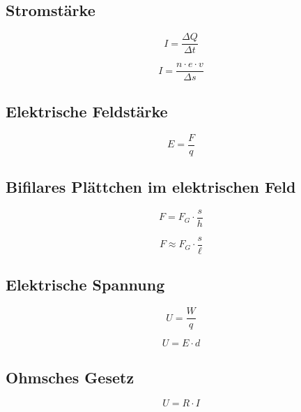 
\subsection{Stromstärke}
\begin{equation}\label{eq:elektrischer:strom}
I = \frac{\Delta Q}{\Delta t}
\end{equation}

\begin{equation}\label{eq:elektrischer:strom:elektronen}
I = \frac{n \cdot e \cdot v}{\Delta s}
\end{equation}

\subsection{Elektrische Feldstärke}
\begin{equation}\label{eq:elektrische:feldstaerke}
E = \frac{F}{q}
\end{equation}

\subsection{Bifilares Plättchen im elektrischen Feld}
\begin{equation}\label{eq:bifilares:plaettchen:1}
F = F_G \cdot \frac{s}{h}
\end{equation}

\begin{equation}\label{eq:bifilares:plaettchen:2}
F \approx F_G \cdot \frac{s}{\ell}
\end{equation}

\subsection{Elektrische Spannung}
\begin{equation}\label{eq:elektrische:spannung}
U = \frac{W}{q}
\end{equation}

\begin{equation}\label{eq:elektrische:spannung:feld}
U = E \cdot d
\end{equation}

\subsection{Ohmsches Gesetz}
\begin{equation}\label{eq:ohmsches:gesetz}
U = R \cdot I
\end{equation}


